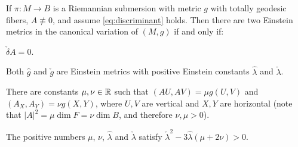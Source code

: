 \begin{thm}\label{thm:twoEinsteins}
	If $\pi:M\to B$ is a Riemannian submersion with metric $g$ with totally geodesic fibers, $A\not\equiv 0$, and assume \eqref{eq:discriminant} holds. Then there are two Einstein metrics in the canonical variation of $(M,g)$ if and only if:
	\begin{numberedlist}
		\item $\check\delta A=0$.
		\item Both $\hat g$ and $\check g$ are Einstein metrics with positive Einstein constants $\hat \lambda$ and $\check\lambda$.
		\item There are constants $\mu,\nu\in \mathbb{R}$ such that $(AU,AV)=\mu g(U,V)$ and $(A_X,A_Y)=\nu g(X,Y)$, where $U,V$ are vertical and $X,Y$ are horizontal (note that $\lvert A\rvert^2=\mu\dim F=\nu\dim B$, and therefore $\nu,\mu>0$).
		\item The positive numbers $\mu$, $\nu$, $\hat\lambda$ and $\check\lambda$ satisfy $\check\lambda^2-3\hat\lambda(\mu+2\nu)>0$.\proofclear
	\end{numberedlist}
\end{thm}

%
